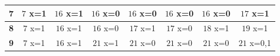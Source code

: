 \documentclass{article}
\begin{document}
\begin{center}
\begin{tabular}{|c||c|c|c|c|c|c|c|}
        \hline
        \textbf{7}& \cellcolor[HTML]{3FFC45}$7$ x={1} & \cellcolor[HTML]{3FFC45}$16$ x={1} & \cellcolor[HTML]{FC3F3F}$16$ x={0}& \cellcolor[HTML]{FC3F3F}$16$ x={0}& \cellcolor[HTML]{FC3F3F}$16$ x={0}& \cellcolor[HTML]{FC3F3F}$16$ x={0}& \cellcolor[HTML]{3FFC45}$17$ x={1} \\
        \hline
        \textbf{8}& \cellcolor[HTML]{3FFC45}$7$ x={1} & \cellcolor[HTML]{3FFC45}$16$ x={1} & \cellcolor[HTML]{FC3F3F}$16$ x={0}& \cellcolor[HTML]{3FFC45}$17$ x={1} & \cellcolor[HTML]{FC3F3F}$17$ x={0}& \cellcolor[HTML]{3FFC45}$18$ x={1} & \cellcolor[HTML]{3FFC45}$19$ x={1} \\
        \hline
        \textbf{9}& \cellcolor[HTML]{3FFC45}$7$ x={1} & \cellcolor[HTML]{3FFC45}$16$ x={1} & \cellcolor[HTML]{3FFC45}$21$ x={1} & \cellcolor[HTML]{FC3F3F}$21$ x={0}& \cellcolor[HTML]{FC3F3F}$21$ x={0}& \cellcolor[HTML]{FC3F3F}$21$ x={0}& \cellcolor[HTML]{3F62FC}$21$ x={0,1}\\
        \hline
    \end{tabular}
\end{center}
\end{document}
